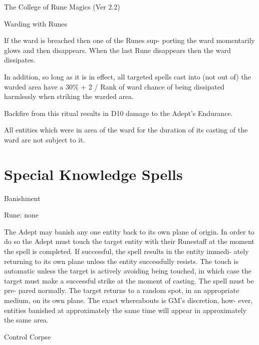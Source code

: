\begin{Chapter}{The College of Rune Magics (Ver 2.2)}
\begin{ritual}[Q-4]{Warding with Runes }
\begin{effects}
If the ward is breached then one of the Runes sup-
porting  the  ward  momentarily  glows  and  then 
disappears. When the last Rune disappears then the 
ward dissipates. 

In  addition,  so  long  as  it  is  in  effect,  all  targeted 
spells cast into (not out of) the warded area have a 
30\% + 2 / Rank of ward chance of being dissipated 
harmlessly when striking the warded area. 

Backfire  from this  ritual  results in  D10  damage  to 
the Adept’s Endurance. 

All entities which were in area of the ward for the 
duration of its casting of the ward are not subject to 
it. 


\end{effects}
\end{ritual}

\section{Special Knowledge Spells}

\begin{spell}[S-1]{Banishment }

Rune: none 
\begin{effects}
The Adept may banish any one entity back 
to  its  own  plane  of  origin.  In  order  to  do  so  the 
Adept  must  touch  the  target  entity  with  their 
Runestaff at  the  moment  the  spell  is completed.  If 
successful,  the  spell  results  in  the  entity  immedi-
ately  returning  to  its  own  plane  unless  the  entity 
successfully  resists.  The  touch  is  automatic  unless 
the  target  is  actively  avoiding  being  touched,  in 
which case the target must make a successful strike 
at  the  moment  of  casting.  The  spell  must  be  pre-
pared  normally.  The  target  returns  to  a  random 
spot,  in  an  appropriate  medium,  on  its  own  plane. 
The  exact  whereabouts  is  GM’s  discretion,  how-
ever,  entities  banished  at  approximately  the  same 
time will appear in approximately the same area. 

\end{effects}
\end{spell}

\begin{spell}[S-2]{Control Corpse }


\end{spell}
\end{Chapter}
